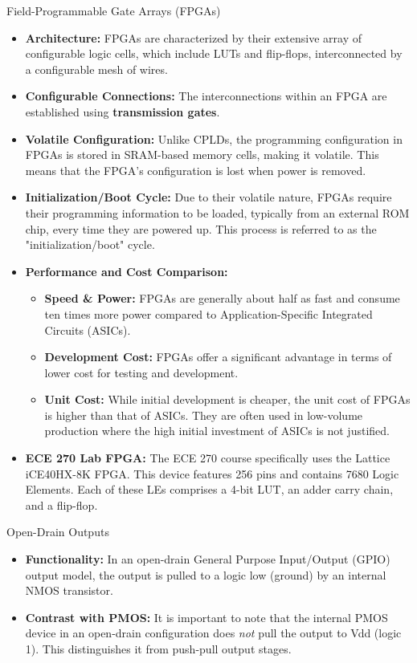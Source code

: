 \documentclass{article}
\begin{document}
\begin{itemize}
Field-Programmable Gate Arrays (FPGAs)

\begin{itemize}
    \item \textbf{Architecture:} FPGAs are characterized by their extensive array of configurable logic cells, which include LUTs and flip-flops, interconnected by a configurable mesh of wires.
    \item \textbf{Configurable Connections:} The interconnections within an FPGA are established using \textbf{transmission gates}.
    \item \textbf{Volatile Configuration:} Unlike CPLDs, the programming configuration in FPGAs is stored in SRAM-based memory cells, making it volatile. This means that the FPGA's configuration is lost when power is removed.
    \item \textbf{Initialization/Boot Cycle:} Due to their volatile nature, FPGAs require their programming information to be loaded, typically from an external ROM chip, every time they are powered up. This process is referred to as the "initialization/boot" cycle.
    \item \textbf{Performance and Cost Comparison:}
    \begin{itemize}
        \item \textbf{Speed \& Power:} FPGAs are generally about half as fast and consume ten times more power compared to Application-Specific Integrated Circuits (ASICs).
        \item \textbf{Development Cost:} FPGAs offer a significant advantage in terms of lower cost for testing and development.
        \item \textbf{Unit Cost:} While initial development is cheaper, the unit cost of FPGAs is higher than that of ASICs. They are often used in low-volume production where the high initial investment of ASICs is not justified.
    \end{itemize}
    \item \textbf{ECE 270 Lab FPGA:} The ECE 270 course specifically uses the Lattice iCE40HX-8K FPGA. This device features 256 pins and contains 7680 Logic Elements. Each of these LEs comprises a 4-bit LUT, an adder carry chain, and a flip-flop.
\end{itemize}

Open-Drain Outputs

\begin{itemize}
    \item \textbf{Functionality:} In an open-drain General Purpose Input/Output (GPIO) output model, the output is pulled to a logic low (ground) by an internal NMOS transistor.
    \item \textbf{Contrast with PMOS:} It is important to note that the internal PMOS device in an open-drain configuration does \textit{not} pull the output to Vdd (logic 1). This distinguishes it from push-pull output stages.
\end{itemize}


\end{itemize}
\end{document}
